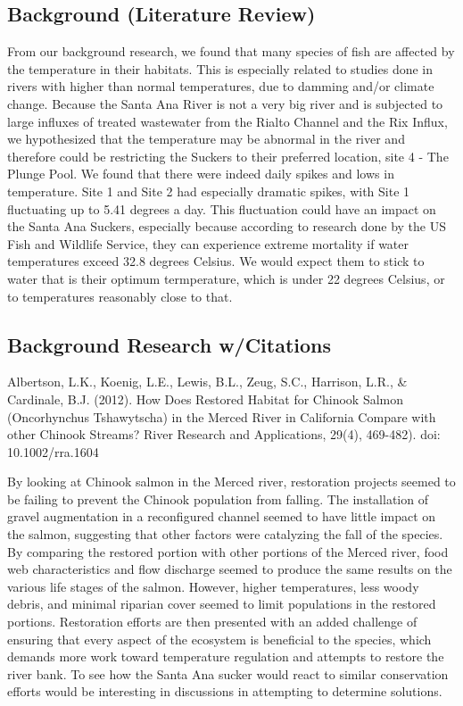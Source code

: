 \documentclass{article}
\begin{document}
\subsection{Background (Literature Review)}
From our background research, we found that many species of fish are affected by the temperature in their habitats. This is especially related to studies done in rivers with higher than normal temperatures, due to damming and/or climate change. Because the Santa Ana River is not a very big river and is subjected to large influxes of treated wastewater from the Rialto Channel and the Rix Influx, we hypothesized that the temperature may be abnormal in the river and therefore could be restricting the Suckers to their preferred location, site 4 - The Plunge Pool. We found that there were indeed daily spikes and lows in temperature. Site 1 and Site 2 had especially dramatic spikes, with Site 1 fluctuating up to 5.41 degrees a day. This fluctuation could have an impact on the Santa Ana Suckers, especially because according to research done by the US Fish and Wildlife Service, they can experience extreme mortality if water temperatures exceed 32.8 degrees Celsius. We would expect them to stick to water that is their optimum termperature, which is under 22 degrees Celsius, or to temperatures reasonably close to that. 
 
\subsection{Background Research w/Citations} 

Albertson, L.K., Koenig, L.E., Lewis, B.L., Zeug, S.C., Harrison, L.R., \& Cardinale, B.J. (2012). How Does Restored Habitat for Chinook Salmon (Oncorhynchus Tshawytscha) in the Merced River in California Compare with other Chinook Streams? River Research and Applications, 29(4), 469-482). doi: 10.1002/rra.1604

By looking at Chinook salmon in the Merced river, restoration projects seemed to be failing to prevent the Chinook population from falling. The installation of gravel augmentation in a reconfigured channel seemed to have little impact on the salmon, suggesting that other factors were catalyzing the fall of the species. By comparing the restored portion with other portions of the Merced river, food web characteristics and flow discharge seemed to produce the same results on the various life stages of the salmon. However, higher temperatures, less woody debris, and minimal riparian cover seemed to limit populations in the restored portions. Restoration efforts are then presented with an added challenge of ensuring that every aspect of the ecosystem is beneficial to the species, which demands more work toward temperature regulation and attempts to restore the river bank. To see how the Santa Ana sucker would react to similar conservation efforts would be interesting in discussions in attempting to determine solutions. 
\end{document}
